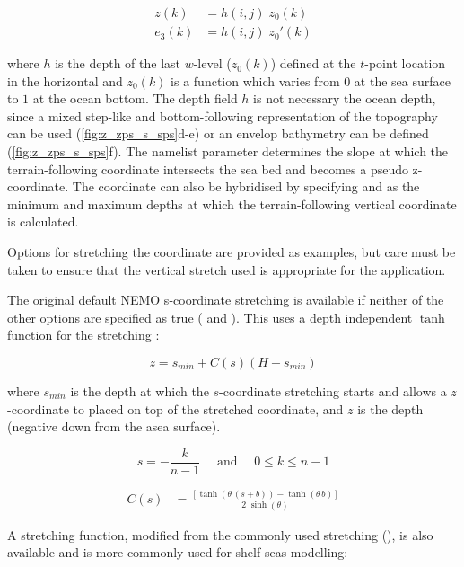 \documentclass[../main/NEMO_manual]{subfiles}
\begin{document}
\[
  \begin{split}
    z(k) 		&= h(i,j) \; z_0(k)	\\
    e_3(k)	&= h(i,j) \; z_0'(k)
  \end{split}
\]

where $h$ is the depth of the last $w$-level ($z_0(k)$) defined at the $t$-point location in the horizontal and
$z_0(k)$ is a function which varies from $0$ at the sea surface to $1$ at the ocean bottom.
The depth field $h$ is not necessary the ocean depth,
since a mixed step-like and bottom-following representation of the topography can be used
(\autoref{fig:z_zps_s_sps}d-e) or an envelop bathymetry can be defined (\autoref{fig:z_zps_s_sps}f).
The namelist parameter  determines the slope at which
the terrain-following coordinate intersects the sea bed and becomes a pseudo z-coordinate. 
The coordinate can also be hybridised by specifying  and  as
the minimum and maximum depths at which the terrain-following vertical coordinate is calculated.

Options for stretching the coordinate are provided as examples,
but care must be taken to ensure that the vertical stretch used is appropriate for the application.

The original default NEMO s-coordinate stretching is available if neither of the other options are specified as true
( and ). 
This uses a depth independent $\tanh$ function for the stretching \citep{Madec_al_JPO96}:

\[
  z = s_{min}+C\left(s\right)\left(H-s_{min}\right)
\]

where $s_{min}$ is the depth at which the $s$-coordinate stretching starts and
allows a $z$-coordinate to placed on top of the stretched coordinate,
and $z$ is the depth (negative down from the asea surface).

\[
  s = -\frac{k}{n-1} \quad \text{ and } \quad 0 \leq k \leq n-1
\]

\[
  \begin{split}
    C(s)	&=  \frac{ \left[	  \tanh{ \left( \theta \, (s+b) \right)}
        - \tanh{ \left(  \theta \, b      \right)}  \right]}
    {2\;\sinh \left( \theta \right)}
  \end{split}
\]

A stretching function,
modified from the commonly used \citet{Song_Haidvogel_JCP94} stretching (),
is also available and is more commonly used for shelf seas modelling:
\end{document}

